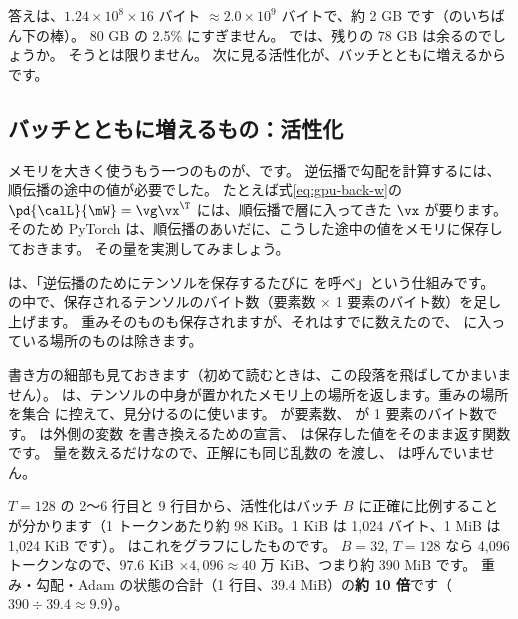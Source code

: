 答えは、$1.24\times10^{8}\times16$ バイト $\approx2.0\times10^{9}$ バイトで、約 2 GB です（のいちばん下の棒）。
80 GB の 2.5\% にすぎません。
では、残りの 78 GB は余るのでしょうか。
そうとは限りません。
次に見る活性化が、バッチとともに増えるからです。

\subsection*{バッチとともに増えるもの：活性化}

メモリを大きく使うもう一つのものが、です。
逆伝播で勾配を計算するには、順伝播の途中の値が必要でした。
たとえば式\eqref{eq:gpu-back-w}の $\pd{\calL}{\mW}=\vg\vx^\T$ には、順伝播で層に入ってきた $\vx$ が要ります。
そのため PyTorch は、順伝播のあいだに、こうした途中の値をメモリに保存しておきます。
その量を実測してみましょう。


 は、「逆伝播のためにテンソルを保存するたびに  を呼べ」という仕組みです。
 の中で、保存されるテンソルのバイト数（要素数 $\times$ 1 要素のバイト数）を足し上げます。
重みそのものも保存されますが、それはすでに数えたので、 に入っている場所のものは除きます。

書き方の細部も見ておきます（初めて読むときは、この段落を飛ばしてかまいません）。
 は、テンソルの中身が置かれたメモリ上の場所を返します。重みの場所を集合  に控えて、見分けるのに使います。
 が要素数、 が 1 要素のバイト数です。
 は外側の変数  を書き換えるための宣言、 は保存した値をそのまま返す関数です。
量を数えるだけなので、正解にも同じ乱数の  を渡し、 は呼んでいません。


$T=128$ の 2〜6 行目と 9 行目から、活性化はバッチ $B$ に正確に比例することが分かります（1 トークンあたり約 98 KiB。1 KiB は 1,024 バイト、1 MiB は 1,024 KiB です）。
はこれをグラフにしたものです。
$B=32$, $T=128$ なら 4,096 トークンなので、$97.6$ KiB $\times4{,}096\approx40$ 万 KiB、つまり約 390 MiB です。
重み・勾配・Adam の状態の合計（1 行目、39.4 MiB）の\textbf{約 10 倍}です（$390\div39.4\approx9.9$）。

